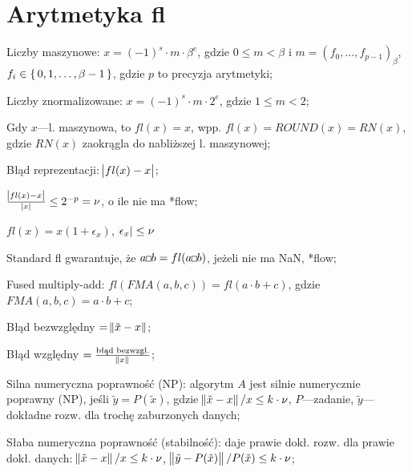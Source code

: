 \section{Arytmetyka fl}

\entry
Liczby maszynowe: $x=(-1)^s \cdot m \cdot \beta^e$, gdzie $0\leq m < \beta$ i $m=(f_0, \ldots, f_{p-1})_\beta$, $f_i\in\set{0,1,\ldots,\beta-1}$, gdzie $p$ to precyzja arytmetyki;

\entry
Liczby znormalizowane: $x=(-1)^s\cdot m \cdot 2^e$, gdzie $1\leq m < 2$;

\entry
Gdy $x$---l. maszynowa, to $fl(x)=x$, wpp. $fl(x)=ROUND(x)=RN(x)$, gdzie $RN(x)$ zaokrągla do nabliższej l. maszynowej;

\entry
Błąd reprezentacji: $\abs{fl(x) - x}$;

\entry
$\frac{\abs{fl(x) - x}}{\abs{x}}\leq 2^{-p}=\nu$, o ile nie ma *flow;

\entry
$fl(x) = x(1+\epsilon_x)$, $\abs{\epsilon_x}\leq \nu$

\entry
Standard fl gwarantuje, że $a \Hsquare b = fl(a\Hsquare b)$, jeżeli nie ma NaN, *flow;

\entry
Fused multiply-add: $fl(FMA(a,b,c)) = fl(a \cdot b + c)$, gdzie $FMA(a,b,c)=a\cdot b + c$;


\entry
Błąd bezwzględny $=\norm{\tilde{x} - x}$;

\entry
Błąd względny $=\frac{\text{błąd bezwzgl.}}{\norm{x}}$;

\entry
Silna numeryczna poprawność (NP): algorytm $A$ jest silnie numerycznie poprawny (NP), jeśli $\tilde{y} = P(\tilde{x})$, gdzie $\norm{\tilde{x}-x} / x\leq k\cdot\nu$, $P$---zadanie, $\tilde{y}$---dokładne rozw. dla trochę zaburzonych danych;

\entry
Słaba numeryczna poprawność (stabilność): daje prawie dokł. rozw. dla prawie dokł. danych: $\norm{\tilde{x}-x} / x\leq k\cdot\nu$, $\norm{\tilde{y}-P(\tilde{x})} / P(\tilde{x})\leq k\cdot\nu$;
